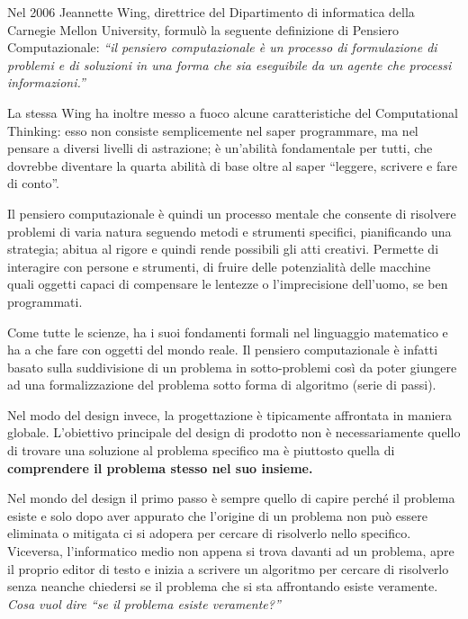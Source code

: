  Nel 2006 Jeannette Wing, direttrice del Dipartimento di informatica della Carnegie Mellon University, formulò la seguente definizione di Pensiero Computazionale:
\textit{``il pensiero computazionale è un processo di formulazione di problemi e di soluzioni in una forma che sia eseguibile da un agente che processi informazioni.''}

La stessa Wing ha inoltre messo a fuoco alcune caratteristiche del Computational Thinking: esso non consiste semplicemente nel saper programmare, ma nel pensare a diversi livelli di astrazione; è un’abilità fondamentale per tutti, che dovrebbe diventare la quarta abilità di base oltre al saper ``leggere, scrivere e fare di conto''.

Il pensiero computazionale è quindi un processo mentale che consente di risolvere problemi di varia natura seguendo metodi e strumenti specifici, pianificando una strategia; abitua al rigore e quindi rende possibili gli atti creativi. Permette di interagire con persone e strumenti, di fruire delle potenzialità delle macchine quali oggetti capaci di compensare le lentezze o l’imprecisione dell’uomo, se ben programmati.

Come tutte le scienze, ha i suoi fondamenti formali nel linguaggio matematico e ha a che fare con oggetti del mondo reale. Il pensiero computazionale è infatti basato sulla suddivisione di un problema in sotto-problemi così da poter giungere ad una formalizzazione del problema sotto forma di algoritmo (serie di passi). 

Nel modo del design invece, la progettazione è tipicamente affrontata in maniera globale. L'obiettivo principale del design di prodotto non è necessariamente quello di trovare una soluzione al problema specifico ma è piuttosto quella di \textbf{comprendere il problema stesso nel suo insieme.}

Nel mondo del design il primo passo è sempre quello di capire perché il problema esiste e solo dopo aver appurato che l'origine di un problema non può essere eliminata o mitigata ci si adopera per cercare di risolverlo nello specifico. Viceversa, l'informatico medio non appena si trova davanti ad un problema, apre il proprio editor di testo e inizia a scrivere un algoritmo per cercare di risolverlo senza neanche chiedersi se il problema che si sta affrontando esiste veramente.\\

\textit{Cosa vuol dire ``se il problema esiste veramente?''}\\

